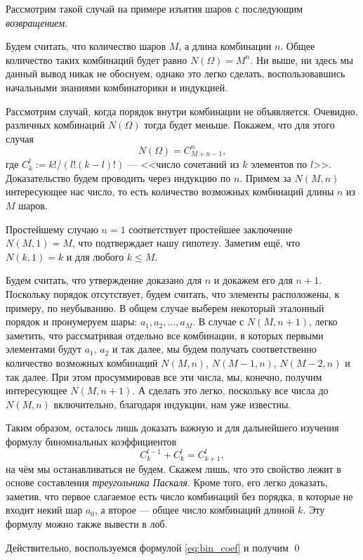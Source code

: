 Рассмотрим такой случай на примере изъятия шаров с последующим
\emph{возвращением}.
\begin{example}
	Будем считать, что количество шаров $ M $, а длина комбинации $ n $. Общее количество таких
	комбинаций будет равно $ N(\Omega) = M^n $. Ни выше, ни здесь мы данный вывод
	никак не обоснуем, однако это легко сделать, воспользовавшись начальными
	знаниями комбинаторики и индукцией.

	Рассмотрим случай, когда порядок внутри комбинации не объявляется. Очевидно,
	различных комбинаций $ N(\Omega) $ тогда будет меньше. Покажем, что для этого
	случая  
	\[
		N(\Omega) = C^n_{M+n-1},
	\]
	где $ C^l_k := k!/(l!(k-l)!) $ --- <<число сочетаний из $ k $ элементов по $ l
	$>>. Доказательство будем проводить через индукцию по $ n $. Примем за $ N(M,
n) $ интересующее нас число, то есть количество возможных комбинаций длины $n$
из $ M $
шаров. 

	Простейшему случаю $ n = 1 $ соответствует простейшее заключение $ N(M, 1) = M
	$, что подтверждает нашу гипотезу. Заметим ещё, что $ N(k, 1) = k $ и для
	любого $ k \leqslant M $.

	Будем считать, что утверждение доказано для $ n $ и докажем его для $ n + 1 $.
	Поскольку порядок отсутствует, будем считать, что элементы расположены, к
	примеру, по неубыванию. В общем случае выберем некоторый эталонный порядок и
	пронумеруем шары: $ a_1, a_2, \dots, a_M $. В случае с $ N(M, n+1) $, легко заметить, что
	рассматривая отдельно все комбинации, в которых первыми элементами будут $ a_1
	$, $a_2$ и так далее, мы будем получать соответственно количество возможных
	комбинаций $ N(M, n)$, $N(M-1, n)$, $ N(M-2, n) $ и так далее. При этом просуммировав все
	эти числа, мы, конечно, получим интересующее $ N(M,n+1) $. А сделать это
	легко, поскольку все числа до $N(M, n)$ включительно, благодаря индукции, нам
	уже известны.

	Таким образом, осталось лишь доказать важную и для дальнейшего изучения
	формулу биномиальных коэффициентов
	\begin{equation}
		\label{eq:bin_coef}
		C^{l-1}_k + C^l_k = C^l_{k+1},
	\end{equation}
на чём мы останавливаться не будем. Скажем лишь, что это свойство лежит в основе
составления \emph{треугольника Паскаля}. Кроме того,  его легко доказать, заметив,
что первое слагаемое есть число комбинаций без порядка, в которые не входит
некий шар $ a_0 $, а второе --- общее число комбинаций длиной $ k $. Эту формулу
можно также вывести в лоб. 

Действительно, воспользуемся формулой \eqref{eq:bin_coef} и получим \qed
\end{example}

